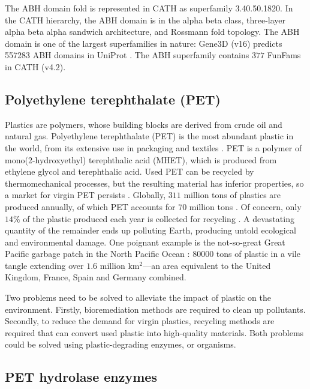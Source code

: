 The ABH domain fold is represented in CATH as superfamily 3.40.50.1820. In the CATH hierarchy, the ABH domain is in the alpha beta class, three-layer alpha beta alpha sandwich architecture, and Rossmann fold \cite{Rao1973} topology. The ABH domain is one of the largest superfamilies in nature: Gene$3$D (v16) predicts \num{557283} ABH domains in UniProt \cite{Lewis2018,Bateman2019}. The ABH superfamily contains $377$ FunFams in CATH (v4.2).

\subsection{Polyethylene terephthalate (PET)}
\label{sec:intro-PET}

Plastics are polymers, whose building blocks are derived from crude oil and natural gas. Polyethylene terephthalate (PET) is the most abundant plastic in the world, from its extensive use in packaging and textiles \cite{Geyer2017}. PET is a polymer of mono(2-hydroxyethyl) terephthalic acid (MHET), which is produced from ethylene glycol and terephthalic acid. Used PET can be recycled by thermomechanical processes, but the resulting material has inferior properties, so a market for virgin PET persists \cite{Ragaert2017}. Globally, $311$ million tons of plastics are produced annually, of which PET accounts for $70$ million tons \cite{Bornscheuer2016}. Of concern, only $14\%$ of the plastic produced each year is collected for recycling \cite{Bornscheuer2016}. A devastating quantity of the remainder ends up polluting Earth, producing untold ecological \cite{Wilcox2015,Law2014,Rochman2018} and environmental \cite{Lebreton2018,Lacerda2019} damage. One poignant example is the not-so-great Great Pacific garbage patch in the North Pacific Ocean \cite{Lebreton2018}: \num{80000} tons of plastic in a vile tangle extending over $1.6$ million km$^2$---an area equivalent to the United Kingdom, France, Spain and Germany combined.

Two problems need to be solved to alleviate the impact of plastic on the environment. Firstly, bioremediation methods are required to clean up pollutants. Secondly, to reduce the demand for virgin plastics, recycling methods are required that can convert used plastic into high-quality materials. Both problems could be solved using plastic-degrading enzymes, or organisms.

\subsection{PET hydrolase enzymes}
\label{sec:intro-PETase}

